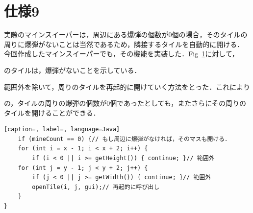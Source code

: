 \documentclass[a4j,11pt]{jsarticle}
\newcommand{\figref}[1]{Fig\ \ref{#1}}
\begin{document}
\section*{仕様9}
\setcounter{section}{9}
実際のマインスイーパーは，周辺にある爆弾の個数が0個の場合，そのタイルの周りに爆弾がないことは当然であるため，隣接するタイルを自動的に開ける．
今回作成したマインスイーパーでも，その機能を実装した．\figref{fig:タイルの一部}に対して，のタイルは，爆弾がないことを示している．\par
範囲外を除いて，周りのタイルを再起的に開けていく方法をとった．これによりの，タイルの周りの爆弾の個数が0個であったとしても，またさらにその周りのタイルを開けることができる．
\begin{figure}[h]
    \centering
    \caption{}
    \label{fig:タイルの一部}
\end{figure}
\begin{lstlisting}[caption=, label=, language=Java]
    if (mineCount == 0) {// もし周辺に爆弾がなければ，そのマスも開ける．
    for (int i = x - 1; i < x + 2; i++) {
        if (i < 0 || i >= getHeight()) { continue; }// 範囲外
    for (int j = y - 1; j < y + 2; j++) {
        if (j < 0 || j >= getWidth()) { continue; }// 範囲外
        openTile(i, j, gui);// 再起的に呼び出し
    }
}
\end{lstlisting}
\newpage
\end{document}
